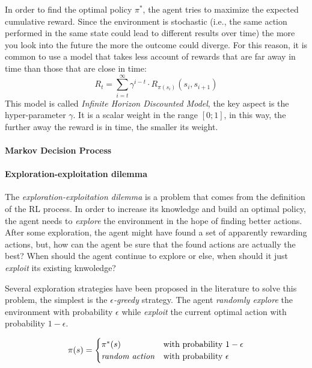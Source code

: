 \documentclass[12pt,a4paper,openright,twoside]{book}
\begin{document}
    In order to find the optimal policy $\pi^*$, the agent tries to maximize the expected cumulative reward.
        Since the environment is stochastic (i.e., the same action performed in the same state could lead to different 
        results over time) the more you look into the future the more the outcome could diverge.
        For this reason, it is common to use a model that takes less account of rewards that are far away in time 
        than those that are close in time:
        $$R_t = \sum_{i=t}^{\infty} \gamma^{i-t} \cdot R_{\pi(s_i)}(s_i, s_{i+1}) $$
        This model is called \emph{Infinite Horizon Discounted Model}, the key aspect is the hyper-parameter $\gamma$.
        It is a scalar weight in the range $[0;1]$, in this way, the further away the reward is in time, the smaller its weight.
\paragraph{Markov Decision Process} 


\paragraph{Exploration-exploitation dilemma}
The \emph{exploration-exploitation dilemma} is a problem that comes from the definition of the RL process.
    In order to increase its knowledge and build an optimal policy, the agent needs to \emph{explore} the environment 
    in the hope of finding better actions. After some exploration, the agent might have found a set of 
    apparently rewarding actions, but, how can the agent be sure that the found actions are actually the best? 
    When should the agent continue to explore or else, when should it just \emph{exploit} its existing knwoledge?

Several exploration strategies have been proposed in the literature to solve this problem, the simplest is the
    \emph{$\epsilon$-greedy} strategy. The agent \emph{randomly explore} the environment with probability $\epsilon$
    while \emph{exploit} the current optimal action with probability $1-\epsilon$.

    $$
    \pi(s)=
    \begin{cases}
        \pi^*(s) & \text{with probability $1-\epsilon$} \\
        \text{\emph{random action}} & \text{with probability $\epsilon$}\\
    \end{cases} 
    $$ 
\end{document}
